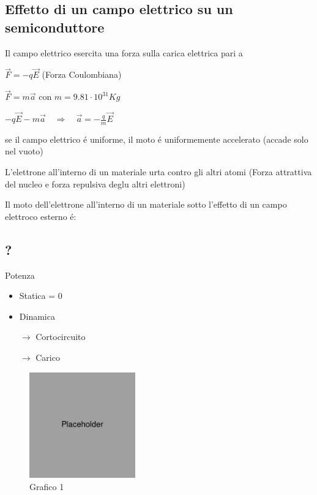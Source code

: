 \documentclass{article}
\begin{document}
\subsection{Effetto di un campo elettrico su un semiconduttore}
Il campo elettrico esercita una forza sulla carica elettrica pari a

$\vec{F} = -q\vec{E}$ (Forza Coulombiana)

$\vec{F} = m\vec{a}$ con $m=9.81\cdot 10^{31}Kg$

$-q\vec{E} - m\vec{a} \quad \Rightarrow \quad \vec{a} = -\frac{q}{m}\vec{E}$

se il campo elettrico \'e uniforme, il moto \'e uniformemente accelerato (accade solo nel vuoto)

L'elettrone all'interno di un materiale urta contro gli altri atomi (Forza attrattiva del nucleo e forza repulsiva deglu altri elettroni)

Il moto dell'elettrone all'interno di un materiale sotto l'effetto di un campo elettroco esterno \'e:



\subsection{?}

Potenza
\begin{itemize}
    \item Statica = 0
    \item Dinamica

        $\rightarrow$ Cortocircuito

        $\rightarrow$ Carico
\end{itemize}

\begin{figure}[h]
    \centering
    \includegraphics[width=1.8in]{placeholder.jpg}
    \caption{Grafico 1}
\end{figure}
\end{document}
